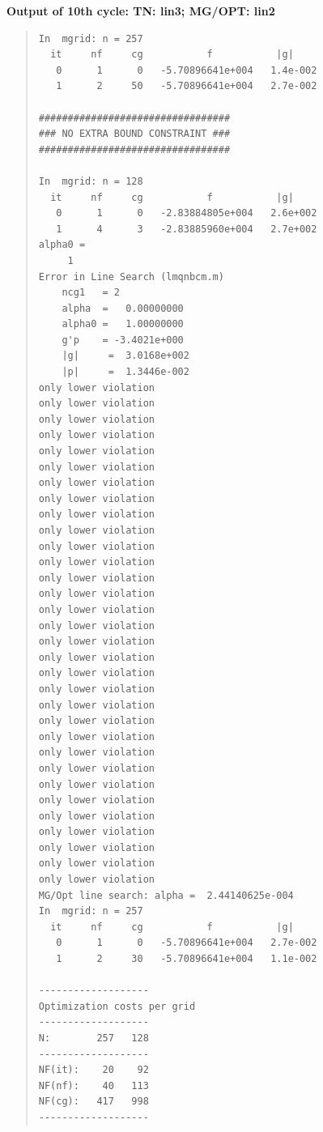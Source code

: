 \documentclass[10pt]{article}
\begin{document}
\bf{Output of 10th cycle: TN: lin3; MG/OPT: lin2}
\begin{quote}
\begin{verbatim}
In  mgrid: n = 257
  it     nf     cg           f           |g|
   0      1      0   -5.70896641e+004   1.4e-002
   1      2     50   -5.70896641e+004   2.7e-002
 
#################################
### NO EXTRA BOUND CONSTRAINT ###
#################################
 
In  mgrid: n = 128
  it     nf     cg           f           |g|
   0      1      0   -2.83884805e+004   2.6e+002
   1      4      3   -2.83885960e+004   2.7e+002
alpha0 =
     1
Error in Line Search (lmqnbcm.m)
    ncg1   = 2
    alpha  =   0.00000000
    alpha0 =   1.00000000
    g'p    = -3.4021e+000
    |g|     =  3.0168e+002
    |p|     =  1.3446e-002
only lower violation
only lower violation
only lower violation
only lower violation
only lower violation
only lower violation
only lower violation
only lower violation
only lower violation
only lower violation
only lower violation
only lower violation
only lower violation
only lower violation
only lower violation
only lower violation
only lower violation
only lower violation
only lower violation
only lower violation
only lower violation
only lower violation
only lower violation
only lower violation
only lower violation
only lower violation
only lower violation
only lower violation
only lower violation
only lower violation
only lower violation
only lower violation
MG/Opt line search: alpha =  2.44140625e-004
In  mgrid: n = 257
  it     nf     cg           f           |g|
   0      1      0   -5.70896641e+004   2.7e-002
   1      2     30   -5.70896641e+004   1.1e-002

-------------------
Optimization costs per grid
-------------------
N:        257   128
-------------------
NF(it):    20    92
NF(nf):    40   113
NF(cg):   417   998
-------------------
\end{verbatim}
\end{quote}
\end{document}
